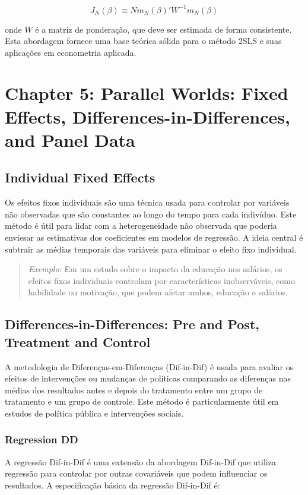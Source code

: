 \documentclass[a4paper,12pt]{article}[abntex2]
\begin{document}
\begin{equation}
J_N(\beta) \equiv N m_N(\beta)' W^{-1} m_N(\beta)
\end{equation}

onde \( W \) é a matriz de ponderação, que deve ser estimada de forma consistente. Esta abordagem fornece uma base teórica sólida para o método 2SLS e suas aplicações em econometria aplicada.

\newpage

\section{Chapter 5: Parallel Worlds: Fixed Effects, Differences-in-Differences, and Panel Data}

\subsection{Individual Fixed Effects}
Os efeitos fixos individuais são uma técnica usada para controlar por variáveis não observadas que são constantes ao longo do tempo para cada indivíduo. Este método é útil para lidar com a heterogeneidade não observada que poderia enviesar as estimativas dos coeficientes em modelos de regressão. A ideia central é subtrair as médias temporais das variáveis para eliminar o efeito fixo individual.

\begin{quote}
\textit{Exemplo:} Em um estudo sobre o impacto da educação nos salários, os efeitos fixos individuais controlam por características inobserváveis, como habilidade ou motivação, que podem afetar ambos, educação e salários.
\end{quote}

\subsection{Differences-in-Differences: Pre and Post, Treatment and Control}
A metodologia de Diferenças-em-Diferenças (Dif-in-Dif) é usada para avaliar os efeitos de intervenções ou mudanças de políticas comparando as diferenças nas médias dos resultados antes e depois do tratamento entre um grupo de tratamento e um grupo de controle. Este método é particularmente útil em estudos de política pública e intervenções sociais.

\subsubsection{Regression DD}
A regressão Dif-in-Dif é uma extensão da abordagem Dif-in-Dif que utiliza regressão para controlar por outras covariáveis que podem influenciar os resultados. A especificação básica da regressão Dif-in-Dif é:
\end{document}
